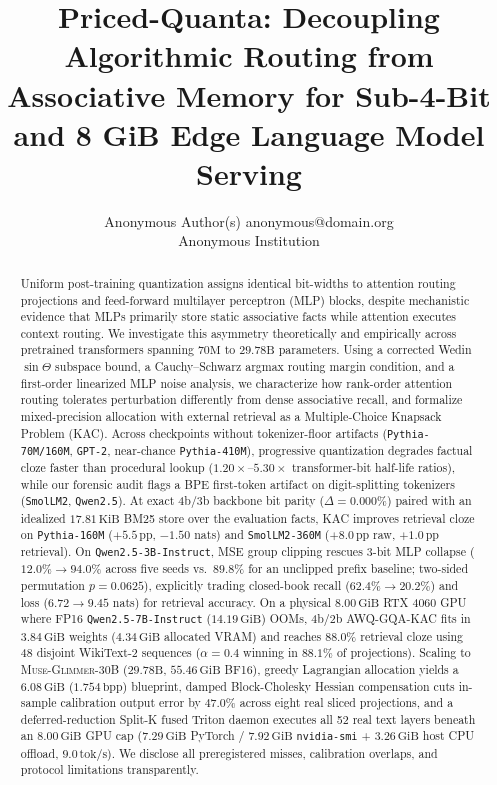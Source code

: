 \documentclass[10pt]{article} %
\title{Priced-Quanta: Decoupling Algorithmic Routing from Associative Memory for Sub-4-Bit and 8 GiB Edge Language Model Serving}
\author{\name Anonymous Author(s) \email anonymous@domain.org \\
      \addr Anonymous Institution}
\newcommand{\kac}{\textsc{KAC}}
\newcommand{\gqakac}{\textsc{GQA-KAC}}
\newcommand{\glimmer}{\textsc{Muse-Glimmer-30B}}
\newcommand{\bpp}{\mathrm{bpp}}
\begin{document}
\maketitle

\begin{abstract}
Uniform post-training quantization assigns identical bit-widths to attention routing projections and feed-forward multilayer perceptron (MLP) blocks, despite mechanistic evidence that MLPs primarily store static associative facts while attention executes context routing. We investigate this asymmetry theoretically and empirically across pretrained transformers spanning $70\text{M}$ to $29.78\text{B}$ parameters. Using a corrected Wedin $\sin\Theta$ subspace bound, a Cauchy--Schwarz argmax routing margin condition, and a first-order linearized MLP noise analysis, we characterize how rank-order attention routing tolerates perturbation differently from dense associative recall, and formalize mixed-precision allocation with external retrieval as a Multiple-Choice Knapsack Problem (\kac{}). Across checkpoints without tokenizer-floor artifacts (\texttt{Pythia-70M/160M}, \texttt{GPT-2}, near-chance \texttt{Pythia-410M}), progressive quantization degrades factual cloze faster than procedural lookup ($1.20\times$--$5.30\times$ transformer-bit half-life ratios), while our forensic audit flags a BPE first-token artifact on digit-splitting tokenizers (\texttt{SmolLM2}, \texttt{Qwen2.5}). At exact 4b/3b backbone bit parity ($\Delta=0.000\%$) paired with an idealized $17.81\,\text{KiB}$ BM25 store over the evaluation facts, \kac{} improves retrieval cloze on \texttt{Pythia-160M} ($+5.5\,\text{pp}$, $-1.50$ nats) and \texttt{SmolLM2-360M} ($+8.0\,\text{pp}$ raw, $+1.0\,\text{pp}$ retrieval). On \texttt{Qwen2.5-3B-Instruct}, MSE group clipping rescues 3-bit MLP collapse ($12.0\% \to 94.0\%$ across five seeds vs.\ $89.8\%$ for an unclipped prefix baseline; two-sided permutation $p=0.0625$), explicitly trading closed-book recall ($62.4\% \to 20.2\%$) and loss ($6.72 \to 9.45$ nats) for retrieval accuracy. On a physical $8.00\,\text{GiB}$ RTX 4060 GPU where FP16 \texttt{Qwen2.5-7B-Instruct} ($14.19\,\text{GiB}$) OOMs, 4b/2b AWQ-\gqakac{} fits in $3.84\,\text{GiB}$ weights ($4.34\,\text{GiB}$ allocated VRAM) and reaches $88.0\%$ retrieval cloze using 48 disjoint WikiText-2 sequences ($\alpha=0.4$ winning in $88.1\%$ of projections). Scaling to \glimmer{} ($29.78\text{B}$, $55.46\,\text{GiB}$ BF16), greedy Lagrangian allocation yields a $6.08\,\text{GiB}$ ($1.754\,\bpp$) blueprint, damped Block-Cholesky Hessian compensation cuts in-sample calibration output error by $47.0\%$ across eight real sliced projections, and a deferred-reduction Split-K fused Triton daemon executes all 52 real text layers beneath an $8.00\,\text{GiB}$ GPU cap ($7.29\,\text{GiB}$ PyTorch / $7.92\,\text{GiB}$ \texttt{nvidia-smi} + $3.26\,\text{GiB}$ host CPU offload, $9.0\,\text{tok/s}$). We disclose all preregistered misses, calibration overlaps, and protocol limitations transparently.
\end{abstract}
\end{document}
